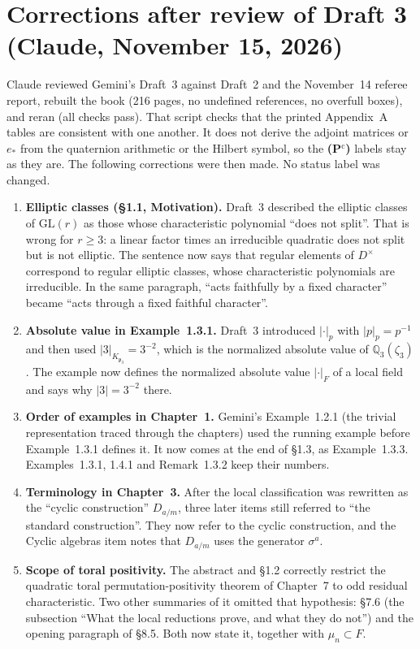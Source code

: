 \documentclass[12pt,letterpaper]{amsart}
\begin{document}
\section{Corrections after review of Draft 3 (Claude, November 15, 2026)}
Claude reviewed Gemini's Draft~3 against Draft~2 and the November~14 referee report, rebuilt the book (216 pages, no undefined references, no overfull boxes), and reran  (all checks pass). That script checks that the printed Appendix~A tables are consistent with one another. It does not derive the adjoint matrices or $e_*$ from the quaternion arithmetic or the Hilbert symbol, so the \textbf{(P$^{\mathrm c}$)} labels stay as they are. The following corrections were then made. No status label was changed.
\begin{enumerate}[leftmargin=*,label=\textbf{C\arabic*.}]
\item \textbf{Elliptic classes (\S1.1, Motivation).} Draft~3 described the elliptic classes of $\mathrm{GL}(r)$ as those whose characteristic polynomial ``does not split''. That is wrong for $r\ge3$: a linear factor times an irreducible quadratic does not split but is not elliptic. The sentence now says that regular elements of $D^\times$ correspond to regular elliptic classes, whose characteristic polynomials are irreducible. In the same paragraph, ``acts faithfully by a fixed character'' became ``acts through a fixed faithful character''.
\item \textbf{Absolute value in Example~1.3.1.} Draft~3 introduced $|\cdot|_p$ with $|p|_p=p^{-1}$ and then used $|3|_{K_{\mathfrak p_3}}=3^{-2}$, which is the normalized absolute value of $\mathbb Q_3(\zeta_3)$. The example now defines the normalized absolute value $|\cdot|_F$ of a local field and says why $|3|=3^{-2}$ there.
\item \textbf{Order of examples in Chapter~1.} Gemini's Example~1.2.1 (the trivial representation traced through the chapters) used the running example before Example~1.3.1 defines it. It now comes at the end of \S1.3, as Example~1.3.3. Examples~1.3.1, 1.4.1 and Remark~1.3.2 keep their numbers.
\item \textbf{Terminology in Chapter~3.} After the local classification was rewritten as the ``cyclic construction'' $D_{a/m}$, three later items still referred to ``the standard construction''. They now refer to the cyclic construction, and the Cyclic algebras item notes that $D_{a/m}$ uses the generator $\sigma^a$.
\item \textbf{Scope of toral positivity.} The abstract and \S1.2 correctly restrict the quadratic toral permutation-positivity theorem of Chapter~7 to odd residual characteristic. Two other summaries of it omitted that hypothesis: \S7.6 (the subsection ``What the local reductions prove, and what they do not'') and the opening paragraph of \S8.5. Both now state it, together with $\mu_n\subset F$.

\end{enumerate}
\end{document}
